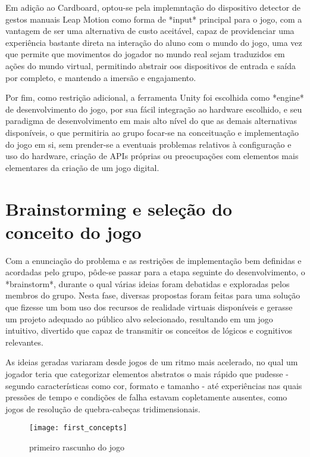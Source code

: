 Em adição ao Cardboard, optou-se pela implemntação do dispositivo detector de gestos manuais Leap Motion como forma de *input* principal para o jogo, com a vantagem de ser uma alternativa de custo aceitável, capaz de providenciar uma experiência bastante direta na interação do aluno com o mundo do jogo, uma vez que permite que movimentos do jogador no mundo real sejam traduzidos em ações do mundo virtual, permitindo abstrair oos dispositivos de entrada e saída por completo, e mantendo a imersão e engajamento.

Por fim, como restrição adicional, a ferramenta Unity foi escolhida como *engine* de desenvolvimento do jogo, por sua fácil integração ao hardware escolhido, e seu paradigma de desenvolvimento em mais alto nível do que as demais alternativas disponíveis, o que permitiria ao grupo focar-se na conceituação e implementação do jogo em si, sem prender-se a eventuais problemas relativos à configuração e uso do hardware, criação de APIs próprias ou preocupações com elementos mais elementares da criação de um jogo digital.

\section{Brainstorming e seleção do conceito do jogo}\label{sec-brainstorming-conceito}

Com a enunciação do problema e as restrições de implementação bem definidas e acordadas pelo grupo, pôde-se passar para a etapa seguinte do desenvolvimento, o *brainstorm*, durante o qual várias ideias foram debatidas e exploradas pelos membros do grupo. Nesta fase, diversas propostas foram feitas para uma solução que fizesse um bom uso dos recursos de realidade virtuais disponíveis e gerasse um projeto adequado ao público alvo selecionado, resultando em um jogo intuitivo, divertido que capaz de transmitir os conceitos de lógicos e cognitivos relevantes.

As ideias geradas variaram desde jogos de um ritmo mais acelerado, no qual um jogador teria que categorizar elementos abstratos o mais rápido que pudesse - segundo características como cor, formato e tamanho - até experiências nas quais pressões de tempo e condições de falha estavam copletamente ausentes, como jogos de resolução de quebra-cabeças tridimensionais.

\begin{figure}[h]
	\centering
	\texttt{[image: first\_concepts]}
	\caption{primeiro rascunho do jogo}
\end{figure}

